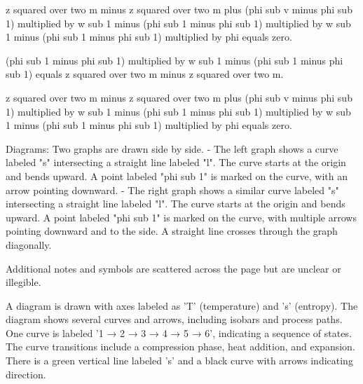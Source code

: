 z squared over two m minus z squared over two m plus (phi sub v minus phi sub 1) multiplied by w sub 1 minus (phi sub 1 minus phi sub 1) multiplied by w sub 1 minus (phi sub 1 minus phi sub 1) multiplied by phi equals zero.  

(phi sub 1 minus phi sub 1) multiplied by w sub 1 minus (phi sub 1 minus phi sub 1) equals z squared over two m minus z squared over two m.  

z squared over two m minus z squared over two m plus (phi sub v minus phi sub 1) multiplied by w sub 1 minus (phi sub 1 minus phi sub 1) multiplied by w sub 1 minus (phi sub 1 minus phi sub 1) multiplied by phi equals zero.  

Diagrams:  
Two graphs are drawn side by side.  
- The left graph shows a curve labeled "s" intersecting a straight line labeled "l". The curve starts at the origin and bends upward. A point labeled "phi sub 1" is marked on the curve, with an arrow pointing downward.  
- The right graph shows a similar curve labeled "s" intersecting a straight line labeled "l". The curve starts at the origin and bends upward. A point labeled "phi sub 1" is marked on the curve, with multiple arrows pointing downward and to the side. A straight line crosses through the graph diagonally.  

Additional notes and symbols are scattered across the page but are unclear or illegible.

A diagram is drawn with axes labeled as 'T' (temperature) and 's' (entropy). The diagram shows several curves and arrows, including isobars and process paths. One curve is labeled '1 → 2 → 3 → 4 → 5 → 6', indicating a sequence of states. The curve transitions include a compression phase, heat addition, and expansion. There is a green vertical line labeled 's' and a black curve with arrows indicating direction.